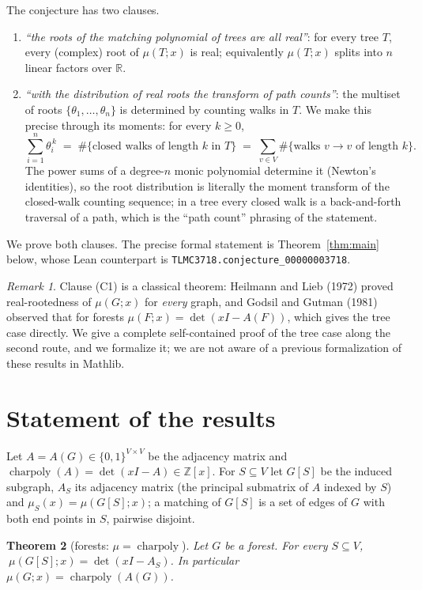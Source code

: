 \documentclass[11pt,a4paper]{article}
\newtheorem{theorem}{Theorem}[section]
\theoremstyle{definition}
\theoremstyle{remark}
\newtheorem{remark}[theorem]{Remark}
\newcommand{\R}{\mathbb{R}}
\newcommand{\Z}{\mathbb{Z}}
\DeclareMathOperator{\charp}{charpoly}
\begin{document}
The conjecture has two clauses.

\begin{enumerate}
\item[(C1)] \emph{``the roots of the matching polynomial of trees are all real''}: for every tree
$T$, every (complex) root of $\mu(T;x)$ is real; equivalently $\mu(T;x)$ splits into $n$ linear
factors over $\R$.
\item[(C2)] \emph{``with the distribution of real roots the transform of path counts''}: the
multiset of roots $\{\theta_1,\dots,\theta_n\}$ is determined by counting walks in $T$. We make
this precise through its moments: for every $k\ge 0$,
\[
  \sum_{i=1}^n \theta_i^{\,k} \;=\; \#\{\text{closed walks of length $k$ in }T\}
  \;=\; \sum_{v\in V}\#\{\text{walks }v\to v\text{ of length }k\}.
\]
The power sums of a degree-$n$ monic polynomial determine it (Newton's identities), so the
root distribution is literally the moment transform of the closed-walk counting sequence; in a
tree every closed walk is a back-and-forth traversal of a path, which is the ``path count''
phrasing of the statement.
\end{enumerate}
We prove both clauses. The precise formal statement is Theorem~\ref{thm:main} below, whose Lean
counterpart is \texttt{TLMC3718.conjecture\_00000003718}.

\begin{remark}
Clause (C1) is a classical theorem: Heilmann and Lieb (1972) proved real-rootedness of
$\mu(G;x)$ for \emph{every} graph, and Godsil and Gutman (1981) observed that for forests
$\mu(F;x)=\det(xI-A(F))$, which gives the tree case directly. We give a complete self-contained
proof of the tree case along the second route, and we formalize it; we are not aware of a
previous formalization of these results in Mathlib.
\end{remark}

\section{Statement of the results}

Let $A=A(G)\in\{0,1\}^{V\times V}$ be the adjacency matrix and $\charp(A)=\det(xI-A)\in\Z[x]$.
For $S\subseteq V$ let $G[S]$ be the induced subgraph, $A_S$ its adjacency matrix (the principal
submatrix of $A$ indexed by $S$) and $\mu_S(x)=\mu(G[S];x)$; a matching of $G[S]$ is a set of
edges of $G$ with both end points in $S$, pairwise disjoint.

\begin{theorem}[forests: $\mu=\charp$]\label{thm:A}
Let $G$ be a forest. For every $S\subseteq V$, $\ \mu(G[S];x)=\det(xI-A_S)$. In particular
$\mu(G;x)=\charp(A(G))$.
\end{theorem}
\end{document}
